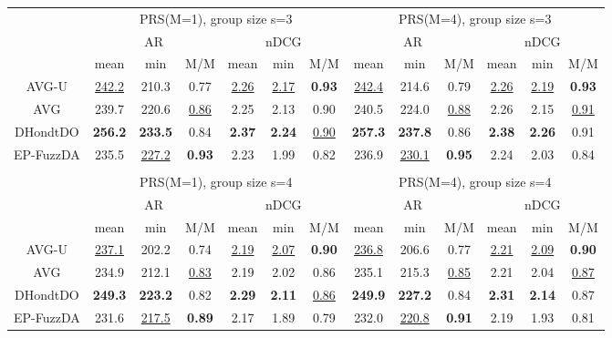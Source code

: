 \begin{tabular}{ c | c c c | c c c || c c c | c c c }

\multicolumn{1}{c}{} & \multicolumn{6}{c}{PRS(M=1), group size s=3} & \multicolumn{6}{c}{PRS(M=4), group size s=3} \\
\multicolumn{1}{c}{} & \multicolumn{3}{c}{AR} & \multicolumn{3}{c}{nDCG} & \multicolumn{3}{c}{AR} & \multicolumn{3}{c}{nDCG} \\
& mean & min & M/M & mean & min & M/M & mean & min & M/M & mean & min & M/M \\
\hline
AVG-U & \underline{242.2} & 210.3 & 0.77 & \underline{2.26} & \underline{2.17} & \textbf{0.93} & \underline{242.4} & 214.6 & 0.79 & \underline{2.26} & \underline{2.19} & \textbf{0.93} \\
AVG & 239.7 & 220.6 & \underline{0.86} & 2.25 & 2.13 & 0.90 & 240.5 & 224.0 & \underline{0.88} & 2.26 & 2.15 & \underline{0.91} \\
DHondtDO & \textbf{256.2} & \textbf{233.5} & 0.84 & \textbf{2.37} & \textbf{2.24} & \underline{0.90} & \textbf{257.3} & \textbf{237.8} & 0.86 & \textbf{2.38} & \textbf{2.26} & 0.91 \\
EP-FuzzDA & 235.5 & \underline{227.2} & \textbf{0.93} & 2.23 & 1.99 & 0.82 & 236.9 & \underline{230.1} & \textbf{0.95} & 2.24 & 2.03 & 0.84 \\

\multicolumn{12}{c}{} \\
\multicolumn{1}{c}{} & \multicolumn{6}{c}{PRS(M=1), group size s=4} & \multicolumn{6}{c}{PRS(M=4), group size s=4} \\
\multicolumn{1}{c}{} & \multicolumn{3}{c}{AR} & \multicolumn{3}{c}{nDCG} & \multicolumn{3}{c}{AR} & \multicolumn{3}{c}{nDCG} \\
& mean & min & M/M & mean & min & M/M & mean & min & M/M & mean & min & M/M \\
\hline
AVG-U & \underline{237.1} & 202.2 & 0.74 & \underline{2.19} & \underline{2.07} & \textbf{0.90} & \underline{236.8} & 206.6 & 0.77 & \underline{2.21} & \underline{2.09} & \textbf{0.90} \\
AVG & 234.9 & 212.1 & \underline{0.83} & 2.19 & 2.02 & 0.86 & 235.1 & 215.3 & \underline{0.85} & 2.21 & 2.04 & \underline{0.87} \\
DHondtDO & \textbf{249.3} & \textbf{223.2} & 0.82 & \textbf{2.29} & \textbf{2.11} & \underline{0.86} & \textbf{249.9} & \textbf{227.2} & 0.84 & \textbf{2.31} & \textbf{2.14} & 0.87 \\
EP-FuzzDA & 231.6 & \underline{217.5} & \textbf{0.89} & 2.17 & 1.89 & 0.79 & 232.0 & \underline{220.8} & \textbf{0.91} & 2.19 & 1.93 & 0.81 \\


\end{tabular}
